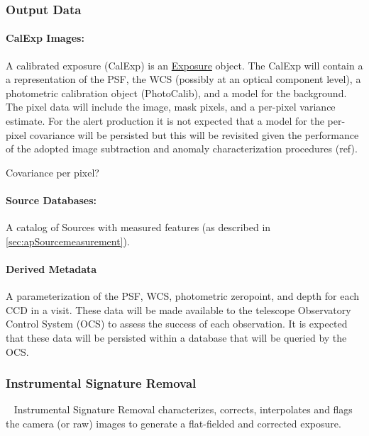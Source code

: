 \subsubsection{Output Data}

\paragraph*{CalExp Images:} A calibrated exposure (CalExp) is an \hyperref[sec:spImagesExposure]{Exposure} object. The CalExp will contain a a representation of the PSF, the WCS (possibly at an optical component level), a photometric calibration object (PhotoCalib),  and a model for the  background. The pixel data will include the image, mask pixels, and a per-pixel variance estimate. For the alert production it is not expected that a model for the per-pixel covariance will be persisted but this will be revisited given the performance of the adopted image subtraction and anomaly characterization procedures (ref).
\begin{note} Covariance per pixel? \end{note}

\paragraph*{Source Databases:} A catalog of Sources with measured features (as described in \ref{sec:apSourcemeasurement}). 

\paragraph*{Derived Metadata} A parameterization of the PSF, WCS, photometric zeropoint, and depth for each CCD in a visit. These data will be made available to the telescope Observatory Control System (OCS) to assess the success of each observation. It is expected that these data will be persisted within a database that will be queried by the OCS.


\subsubsection{Instrumental Signature Removal}~
\label{sec:apISR}
Instrumental Signature Removal characterizes, corrects, interpolates and flags the camera (or raw) images to generate a flat-fielded and corrected exposure.

